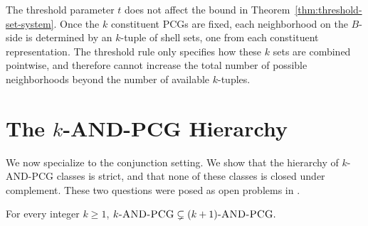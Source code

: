 \documentclass[a4paper,UKenglish,cleveref,autoref,thm-restate]{socg-lipics-v2021}
\begin{document}
\begin{remark}
The threshold parameter $t$ does not affect the bound in
Theorem~\ref{thm:threshold-set-system}. Once the $k$ constituent \textsc{PCG}s are fixed,
each neighborhood on the $B$-side is determined by an $k$-tuple of shell sets, one from
each constituent representation. The threshold rule only specifies how these $k$ sets
are combined pointwise, and therefore cannot increase the total number of possible
neighborhoods beyond the number of available $k$-tuples.
\end{remark}

\section{The \textsc{$k$-\textsc{AND}-\textsc{PCG}} Hierarchy}\label{sec:and}

We now specialize to the conjunction setting. We show that the hierarchy of
\textsc{$k$-\textsc{AND}-\textsc{PCG}} classes is strict, and that none of these classes
is closed under complement. These two questions were posed as open problems in \cite{Calamoneri2021OnGOI, survey}.

\begin{theorem}\label{thm:and-hierarchy}
For every integer $k \ge 1$,
\(
k\textsc{-AND-\textsc{PCG}} \subsetneq (k+1)\textsc{-AND-\textsc{PCG}}.
\)
\end{theorem}
\end{document}
